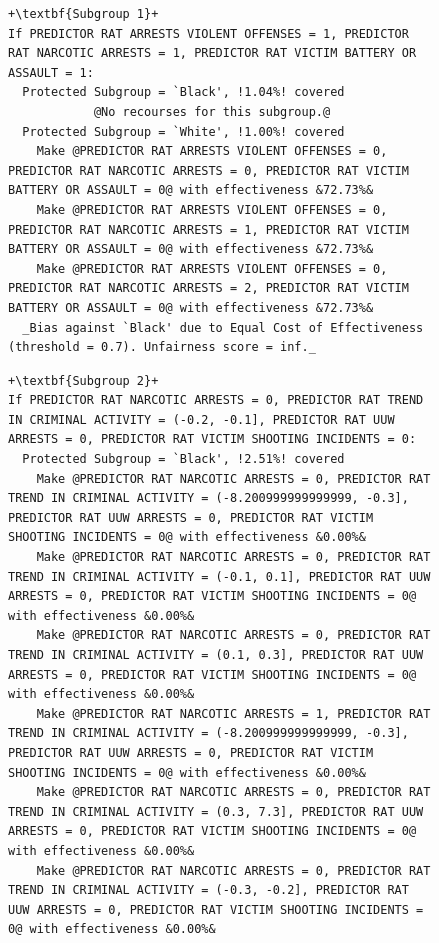 \documentclass{article}
\begin{document}
\begin{figure}[ht]
\centering
\begin{minipage}{1\linewidth}
\begin{lstlisting}[style = base,escapechar=+]
+\textbf{Subgroup 1}+
If PREDICTOR RAT ARRESTS VIOLENT OFFENSES = 1, PREDICTOR RAT NARCOTIC ARRESTS = 1, PREDICTOR RAT VICTIM BATTERY OR ASSAULT = 1:
  Protected Subgroup = `Black', !1.04%! covered
    		@No recourses for this subgroup.@
  Protected Subgroup = `White', !1.00%! covered
    Make @PREDICTOR RAT ARRESTS VIOLENT OFFENSES = 0, PREDICTOR RAT NARCOTIC ARRESTS = 0, PREDICTOR RAT VICTIM BATTERY OR ASSAULT = 0@ with effectiveness &72.73%&
    Make @PREDICTOR RAT ARRESTS VIOLENT OFFENSES = 0, PREDICTOR RAT NARCOTIC ARRESTS = 1, PREDICTOR RAT VICTIM BATTERY OR ASSAULT = 0@ with effectiveness &72.73%&
    Make @PREDICTOR RAT ARRESTS VIOLENT OFFENSES = 0, PREDICTOR RAT NARCOTIC ARRESTS = 2, PREDICTOR RAT VICTIM BATTERY OR ASSAULT = 0@ with effectiveness &72.73%&
  _Bias against `Black' due to Equal Cost of Effectiveness (threshold = 0.7). Unfairness score = inf._
\end{lstlisting}
\begin{lstlisting}[style = base,escapechar=+]
+\textbf{Subgroup 2}+
If PREDICTOR RAT NARCOTIC ARRESTS = 0, PREDICTOR RAT TREND IN CRIMINAL ACTIVITY = (-0.2, -0.1], PREDICTOR RAT UUW ARRESTS = 0, PREDICTOR RAT VICTIM SHOOTING INCIDENTS = 0:
  Protected Subgroup = `Black', !2.51%! covered
    Make @PREDICTOR RAT NARCOTIC ARRESTS = 0, PREDICTOR RAT TREND IN CRIMINAL ACTIVITY = (-8.200999999999999, -0.3], PREDICTOR RAT UUW ARRESTS = 0, PREDICTOR RAT VICTIM SHOOTING INCIDENTS = 0@ with effectiveness &0.00%&
    Make @PREDICTOR RAT NARCOTIC ARRESTS = 0, PREDICTOR RAT TREND IN CRIMINAL ACTIVITY = (-0.1, 0.1], PREDICTOR RAT UUW ARRESTS = 0, PREDICTOR RAT VICTIM SHOOTING INCIDENTS = 0@ with effectiveness &0.00%&
    Make @PREDICTOR RAT NARCOTIC ARRESTS = 0, PREDICTOR RAT TREND IN CRIMINAL ACTIVITY = (0.1, 0.3], PREDICTOR RAT UUW ARRESTS = 0, PREDICTOR RAT VICTIM SHOOTING INCIDENTS = 0@ with effectiveness &0.00%&
    Make @PREDICTOR RAT NARCOTIC ARRESTS = 1, PREDICTOR RAT TREND IN CRIMINAL ACTIVITY = (-8.200999999999999, -0.3], PREDICTOR RAT UUW ARRESTS = 0, PREDICTOR RAT VICTIM SHOOTING INCIDENTS = 0@ with effectiveness &0.00%&
    Make @PREDICTOR RAT NARCOTIC ARRESTS = 0, PREDICTOR RAT TREND IN CRIMINAL ACTIVITY = (0.3, 7.3], PREDICTOR RAT UUW ARRESTS = 0, PREDICTOR RAT VICTIM SHOOTING INCIDENTS = 0@ with effectiveness &0.00%&
    Make @PREDICTOR RAT NARCOTIC ARRESTS = 0, PREDICTOR RAT TREND IN CRIMINAL ACTIVITY = (-0.3, -0.2], PREDICTOR RAT UUW ARRESTS = 0, PREDICTOR RAT VICTIM SHOOTING INCIDENTS = 0@ with effectiveness &0.00%&

\end{lstlisting}
\end{minipage}
\end{figure}
\end{document}
